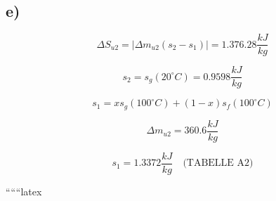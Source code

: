 

\subsection*{e)}
\[
\Delta S_{u2} = \left| \Delta m_{u2} (s_{2} - s_{1}) \right| = 1.376.28 \frac{kJ}{kg}
\]

\[
s_{2} = s_{g} (20^\circ C) = 0.9598 \frac{kJ}{kg}
\]

\[
s_{1} = x s_{g} (100^\circ C) + (1 - x) s_{f} (100^\circ C)
\]

\[
\Delta m_{u2} = 360.6 \frac{kJ}{kg}
\]

\[
s_{1} = 1.3372 \frac{kJ}{kg} \quad \text{(TABELLE A2)}
\]

``````latex